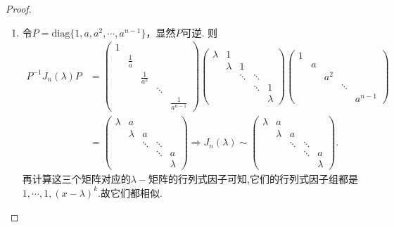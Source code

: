 \documentclass[../../main.tex]{subfiles}
\begin{document}
\begin{proof}
\begin{enumerate}[(1)]
\item 令$P = \mathrm{diag}\{1, a, a^2, \cdots, a^{n-1}\}$，显然$P$可逆. 则
\begin{align*}
P^{-1}J_n(\lambda)P &= \begin{pmatrix}
1 & & & & \\
& \frac{1}{a} & & & \\
& & \frac{1}{a^2} & & \\
& & & \ddots & \\
& & & & \frac{1}{a^{n-1}}
\end{pmatrix} \begin{pmatrix}
\lambda & 1 & & & \\
& \lambda & 1 & & \\
& & \ddots & \ddots & \\
& & & \ddots & 1 \\
& & & & \lambda
\end{pmatrix} \begin{pmatrix}
1 & & & & \\
& a & & & \\
& & a^2 & & \\
& & & \ddots & \\
& & & & a^{n-1}
\end{pmatrix} \\
&= \begin{pmatrix}
\lambda & a & & & \\
& \lambda & a & & \\
& & \ddots & \ddots & \\
& & & \ddots & a \\
& & & & \lambda
\end{pmatrix} \Longrightarrow J_n(\lambda) \sim \begin{pmatrix}
\lambda & a & & & \\
& \lambda & a & & \\
& & \ddots & \ddots & \\
& & & \ddots & a \\
& & & & \lambda
\end{pmatrix}.
\end{align*}
再计算这三个矩阵对应的$\lambda-$矩阵的行列式因子可知,它们的行列式因子组都是$1,\cdots,1,(x-\lambda)^k$.故它们都相似.

\end{enumerate}

\end{proof}
\end{document}
